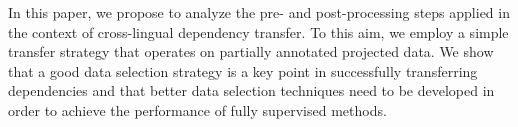 In this paper, we propose to analyze the pre- and post-processing steps applied in the context of cross-lingual dependency transfer. To this aim, we employ a simple transfer strategy that operates on partially annotated projected data. We show that a good data selection strategy is a key point in successfully transferring dependencies and that better data selection techniques need to be developed in order to achieve the performance of fully supervised methods.
